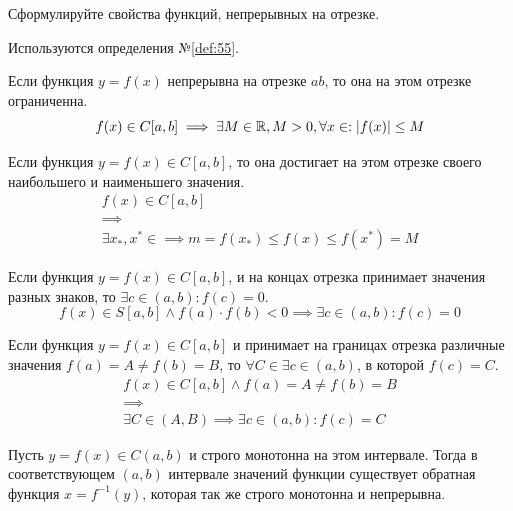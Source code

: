 \begin{question}
    Сформулируйте свойства функций, непрерывных на отрезке.
\end{question}
\begin{used}
    Используются определения №\ref{def:55}.
\end{used}
\begin{theorem}
    Если функция $y = f(x)$ непрерывна на отрезке $ab$, то она на этом отрезке ограниченна. \[
        f(x) \in C[a, b] \implies \exists M \in \mathbb{R}, M > 0, \forall x \in : |f(x)| \le  M
    \] 
\end{theorem}
\begin{theorem}
    Если функция $y = f(x) \in C[a, b]$, то она достигает на этом отрезке своего наибольшего и наименьшего значения.
    \begin{gather*}
        f(x) \in C[a, b] \\
        \implies \\
        \exists x_*, x^* \in \implies m = f(x_*) \le f(x) \le f(x^*) = M
    \end{gather*}
\end{theorem}
\begin{theorem}
    Если функция $y = f(x) \in C[a, b]$, и на концах отрезка принимает значения разных знаков, то $\exists c \in (a, b) : f(c) = 0$. \[
        f(x) \in S[a, b] \land f(a) \cdot f(b) < 0 \implies \exists  c \in (a, b) : f(c) = 0
    \] 
\end{theorem}
\begin{theorem}
    Если функция $y = f(x) \in C[a, b]$ и принимает на границах отрезка различные значения $f(a) = A \neq f(b) = B$, то $\forall C \in \exists c \in (a, b)$, в которой $f(c) = C$.
    \begin{gather*}
        f(x) \in C[a, b] \land f(a) = A \neq f(b) = B \\
        \implies \\
        \exists C \in (A, B) \implies \exists c \in (a, b) : f(c) = C
    \end{gather*}
\end{theorem}
\begin{theorem}
    Пусть $y = f(x) \in C(a, b)$ и строго монотонна на этом интервале. Тогда в соответствующем $(a, b)$ интервале значений функции существует обратная функция $x = f^{-1}(y)$, которая так же строго монотонна и непрерывна.
\end{theorem}
\pagebreak


